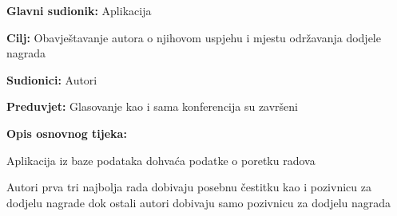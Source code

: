				\noindent {}
				\begin{packed_item}
					
					\item \textbf{Glavni sudionik: }Aplikacija 
					\item  \textbf{Cilj:} Obavještavanje autora o njihovom uspjehu i mjestu održavanja dodjele nagrada
					\item  \textbf{Sudionici:} Autori
					\item  \textbf{Preduvjet:} Glasovanje kao i sama konferencija su završeni
					\item  \textbf{Opis osnovnog tijeka:}
					
					\item[] \begin{packed_enum}
						
						\item Aplikacija iz baze podataka dohvaća podatke o poretku radova
						\item Autori prva tri najbolja rada dobivaju posebnu čestitku kao i pozivnicu za dodjelu nagrade dok ostali autori dobivaju samo pozivnicu za dodjelu nagrada
					\end{packed_enum}
					
				\end{packed_item}	
				
